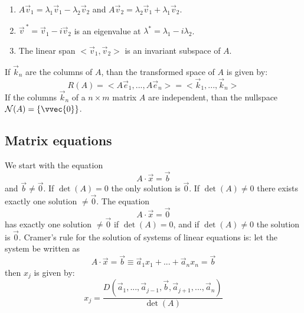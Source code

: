 \begin{enumerate}
\item $A\vec{v}_1=\lambda_1\vec{v}_1-\lambda_2\vec{v}_2$ and $A\vec{v}_2=\lambda_2\vec{v}_1+\lambda_1\vec{v}_2$.
\item $\vec{v}^{~*}=\vec{v}_1-i\vec{v}_2$ is an eigenvalue at $\lambda^*=\lambda_1-i\lambda_2$.
\item The linear span $<\vec{v}_1,\vec{v}_2>$ is an invariant subspace of $A$.
\end{enumerate}
If $\vec{k}_n$ are the columns of $A$, than the transformed space of $A$ is
given by:
\[
R(A)=<A\vec{e}_1,...,A\vec{e}_n>=<\vec{k}_1,...,\vec{k}_n>
\]
If the columns $\vec{k}_n$ of a $n\times m$ matrix $A$ are independent, than
the nullspace ${\cal N}(A)=\{\vvec{0}\}$.

\subsection{Matrix equations}
We start with the equation
\[
A\cdot\vec{x}=\vec{b}
\]
and $\vec{b}\neq\vec{0}$. If $\det(A)=0$ the only solution is $\vec{0}$. If
$\det(A)\neq0$ there exists exactly one solution $\neq\vec{0}$.
\npar
The equation
\[
A\cdot\vec{x}=\vec{0}
\]
has exactly one solution $\neq\vec{0}$ if $\det(A)=0$, and if
$\det(A)\neq0$ the solution is $\vec{0}$.
\npar
Cramer's rule for the solution of systems of linear equations is: let the
system be written as
\[
A\cdot\vec{x}=\vec{b}\equiv\vec{a}_1x_1+...+\vec{a}_nx_n=\vec{b}
\]
then $x_j$ is given by:
\[
x_j=\frac{D(\vec{a}_1,...,\vec{a}_{j-1},\vec{b},\vec{a}_{j+1},...,\vec{a}_n)}{\det(A)}
\]

